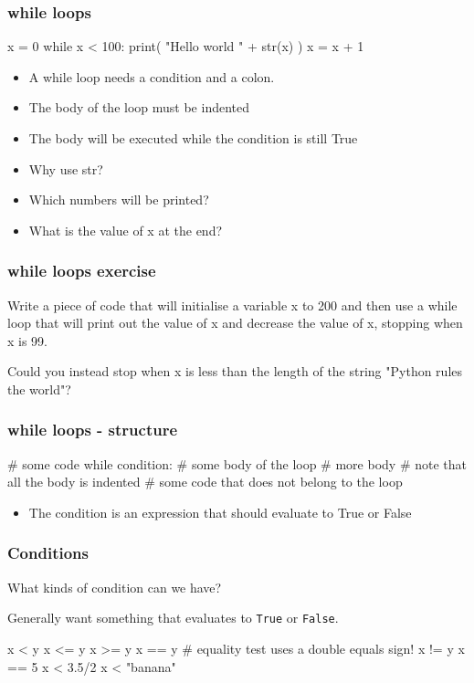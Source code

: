 \documentclass{beamer}
\begin{document}
\begin{frame}[fragile]
\frametitle{while loops}
\begin{code}
x = 0
while x < 100:
   print( "Hello world " + str(x) )
   x = x + 1
\end{code}
\begin{itemize}
\item A while loop needs a condition and a colon.
\item The body of the loop must be indented
\item The body will be executed while the condition is still True
\item Why use str?
\item Which numbers will be printed?
\item What is the value of x at the end?
\end{itemize}
\end{frame}

\begin{frame}[fragile]
\frametitle{while loops exercise}
Write a piece of code that will initialise a variable x to 200
and then use a while loop that will print out the value of x
and decrease the value of x, stopping when x is 99.

\bigskip

Could you instead stop when x is less than the length of
the string "Python rules the world"?
\end{frame}


\begin{frame}[fragile]
\frametitle{while loops - structure}
\begin{code}
# some code
while condition:
   # some body of the loop
   # more body
   # note that all the body is indented
# some code that does not belong to the loop
\end{code}
\begin{itemize}
\item The condition is an expression that should evaluate to True or False
\end{itemize}
\end{frame}

\begin{frame}[fragile]
\frametitle{Conditions}
What kinds of condition can we have?

Generally want something that evaluates to {\tt True} or {\tt False}.

\begin{code}
x < y
x <= y
x >= y
x == y    # equality test uses a double equals sign!
x != y
x == 5
x < 3.5/2
x < "banana"
\end{code}
\end{frame}
\end{document}
